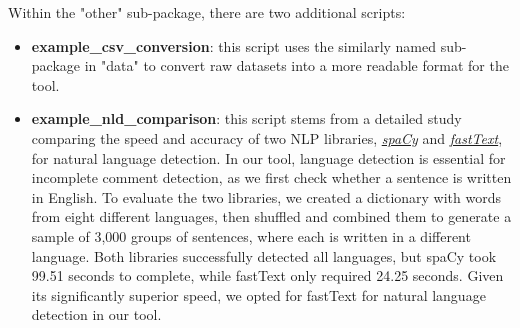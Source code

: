 \noindent Within the "other" sub-package, there are two additional scripts:
	\begin{itemize}
		\item \textbf{example\_csv\_conversion}: this script uses the similarly named sub-package in "data" to convert raw datasets into a more readable format for the tool.
		\item \textbf{example\_nld\_comparison}: this script stems from a detailed study comparing the speed and accuracy of two NLP libraries, \href{https://spacy.io/}{\textit{spaCy}} and \href{https://fasttext.cc/}{\textit{fastText}}, for natural language detection. In our tool, language detection is essential for incomplete comment detection, as we first check whether a sentence is written in English. To evaluate the two libraries, we created a dictionary with words from eight different languages, then shuffled and combined them to generate a sample of 3,000 groups of sentences, where each is written in a different language. Both libraries successfully detected all languages, but spaCy took 99.51 seconds to complete, while fastText only required 24.25 seconds. Given its significantly superior speed, we opted for fastText for natural language detection in our tool.
	\end{itemize}